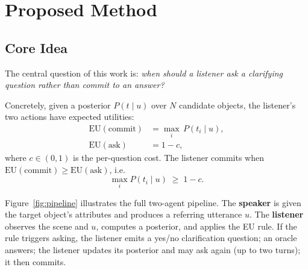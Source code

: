 \section{Proposed Method}

\subsection{Core Idea}

The central question of this work is: \emph{when should a listener ask a
clarifying question rather than commit to an answer?} 

Concretely, given a posterior $P(t\mid u)$ over $N$ candidate objects, the
listener's two actions have expected utilities:
\begin{align}
  \text{EU}(\text{commit}) &= \max_i\, P(t_i \mid u), \label{eq:eu-commit}\\
  \text{EU}(\text{ask})    &= 1 - c, \label{eq:eu-ask}
\end{align}
where $c\in(0,1)$ is the per-question cost.  The listener commits when
$\text{EU}(\text{commit}) \geq \text{EU}(\text{ask})$, i.e.\
\begin{equation}
  \max_i P(t_i\mid u) \;\geq\; 1 - c.
  \label{eq:eu-rule}
\end{equation}

Figure~\ref{fig:pipeline} illustrates the full two-agent pipeline.  The
\textbf{speaker} is given the target object's attributes and produces a
referring utterance $u$.  The \textbf{listener} observes the scene and $u$,
computes a posterior, and applies the EU rule.  If the rule triggers asking,
the listener emits a yes/no clarification question; an oracle answers; the
listener updates its posterior and may ask again (up to two turns); it then
commits.

